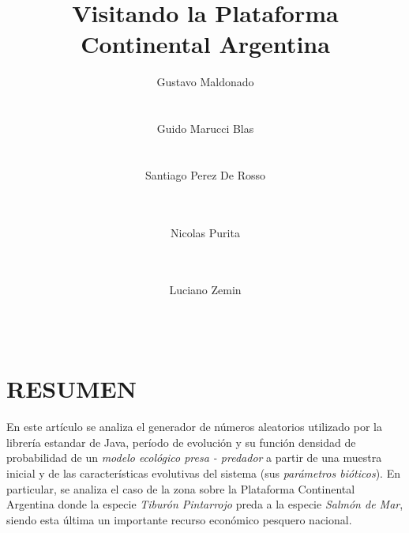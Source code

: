 \documentclass{SPANISH_acm_proc_article-sp}
\begin{document}
\title{Visitando la Plataforma Continental Argentina}
\subtitle{}


\author
{
	\alignauthor
    Gustavo Maldonado \\
	 \\
	\\
	\alignauthor
	Guido Marucci Blas \\
     \\
	\\
	\alignauthor	
    Santiago Perez De Rosso \\
     \\
	\\
	\and
	\alignauthor
	Nicolas Purita \\
     \\
	\\
	\and
    \alignauthor
    Luciano Zemin \\
     \\
	\\
}

\maketitle

\section*{RESUMEN}
En este art\'iculo se analiza el generador de n\'umeros aleatorios utilizado por la librer\'ia estandar de Java, per\'iodo de evoluci\'on y su funci\'on densidad de probabilidad de un \emph{modelo ecol\'ogico presa - predador} a partir de una muestra inicial y de las caracter\'isticas evolutivas del sistema (sus \emph{par\'ametros bi\'oticos}).
En particular, se analiza el caso de la zona sobre la Plataforma Continental Argentina
donde la especie \textit{Tibur\'on Pintarrojo} preda a la especie \textit{Salm\'on de Mar},
siendo esta \'ultima un importante recurso econ\'omico pesquero nacional.
\end{document}
